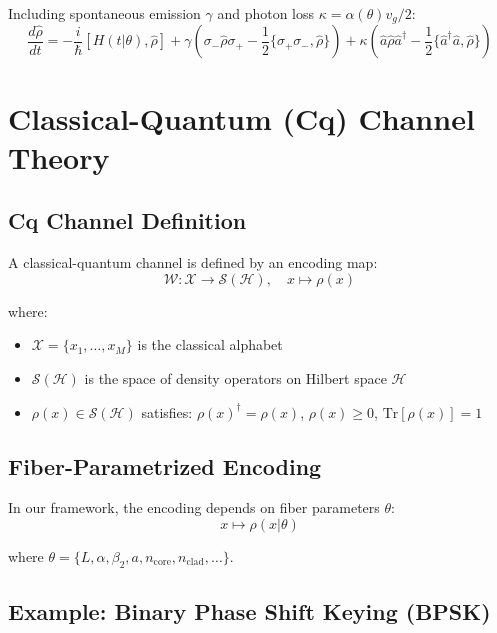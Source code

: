 \documentclass[12pt,a4paper]{article}
\begin{document}
Including spontaneous emission $\gamma$ and photon loss $\kappa = \alpha(\theta)v_g/2$:
\begin{equation}
\frac{d\hat{\rho}}{dt} = -\frac{i}{\hbar}[H(t|\theta), \hat{\rho}] + \gamma\left(\sigma_- \hat{\rho}\sigma_+ - \frac{1}{2}\{\sigma_+\sigma_-, \hat{\rho}\}\right) + \kappa\left(\hat{a}\hat{\rho}\hat{a}^\dagger - \frac{1}{2}\{\hat{a}^\dagger\hat{a}, \hat{\rho}\}\right)
\end{equation}

\section{Classical-Quantum (Cq) Channel Theory}

\subsection{Cq Channel Definition}

A classical-quantum channel is defined by an encoding map:
\begin{equation}
\mathcal{W}: \mathcal{X} \to \mathcal{S}(\mathcal{H}), \quad x \mapsto \rho(x)
\end{equation}

where:
\begin{itemize}
\item $\mathcal{X} = \{x_1, \ldots, x_M\}$ is the classical alphabet
\item $\mathcal{S}(\mathcal{H})$ is the space of density operators on Hilbert space $\mathcal{H}$
\item $\rho(x) \in \mathcal{S}(\mathcal{H})$ satisfies: $\rho(x)^\dagger = \rho(x)$, $\rho(x) \geq 0$, $\text{Tr}[\rho(x)] = 1$
\end{itemize}

\subsection{Fiber-Parametrized Encoding}

In our framework, the encoding depends on fiber parameters $\theta$:
\begin{equation}
x \mapsto \rho(x|\theta)
\end{equation}

where $\theta = \{L, \alpha, \beta_2, a, n_{\text{core}}, n_{\text{clad}}, \ldots\}$.

\subsection{Example: Binary Phase Shift Keying (BPSK)}
\end{document}
